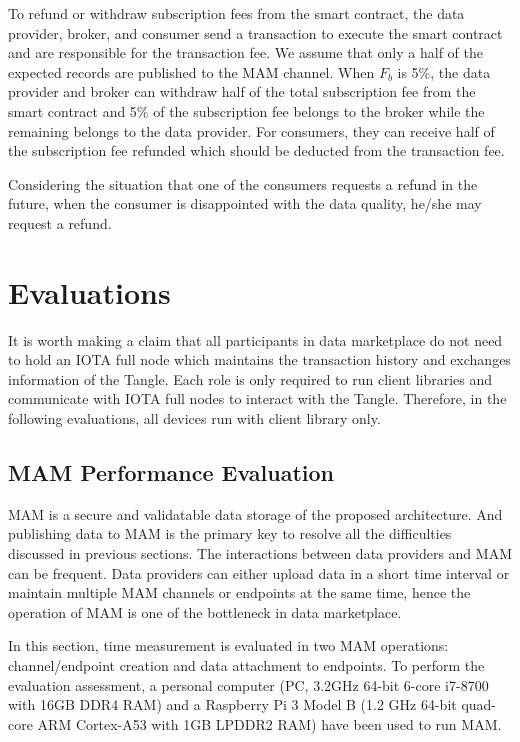 \documentclass[conference]{IEEEtran}
\begin{document}
To refund or withdraw subscription fees from the smart contract, the data provider, broker, and consumer send a transaction to execute the smart contract and are responsible for the transaction fee. We assume that only a half of the expected records are published to the MAM channel. When $F_{b}$ is 5\%, the data provider and broker can withdraw half of the total subscription fee from the smart contract and 5\% of the subscription fee belongs to the broker while the remaining belongs to the data provider. For consumers, they can receive half of the subscription fee refunded which should be deducted from the transaction fee.

Considering the situation that one of the consumers requests a refund in the future, when the consumer is disappointed with the data quality, he/she may request a refund.

\section{Evaluations}
It is worth making a claim that all participants in data marketplace do not need to hold an IOTA full node which maintains the transaction history and exchanges information of the Tangle. Each role is only required to run client libraries and communicate with IOTA full nodes to interact with the Tangle. Therefore, in the following evaluations, all devices run with client library only.

\subsection{MAM Performance Evaluation}
MAM is a secure and validatable data storage of the proposed architecture. And publishing data to MAM is the primary key to resolve all the difficulties discussed in previous sections. The interactions between data providers and MAM can be frequent. Data providers can either upload data in a short time interval or maintain multiple MAM channels or endpoints at the same time, hence the operation of MAM is one of the bottleneck in data marketplace.

In this section, time measurement is evaluated in two MAM operations: channel/endpoint creation and data attachment to endpoints. To perform the evaluation assessment, a personal computer (PC, 3.2GHz 64-bit 6-core i7-8700 with 16GB DDR4 RAM) and a Raspberry Pi 3 Model B (1.2 GHz 64-bit quad-core ARM Cortex-A53 with 1GB LPDDR2 RAM) have been used to run MAM. 
\end{document}
